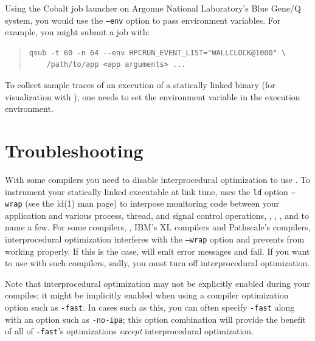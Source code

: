 \documentclass[11pt,letterpaper]{report}
\begin{document}
Using the Cobalt job launcher on Argonne National Laboratory's Blue Gene/Q system, you would use the \texttt{--env} option to pass environment variables.
For example, you might submit a job with:
\begin{quote}
\begin{verbatim}
qsub -t 60 -n 64 --env HPCRUN_EVENT_LIST="WALLCLOCK@1000" \
    /path/to/app <app arguments> ...
\end{verbatim}
\end{quote}

To collect sample traces of  an execution of a statically linked binary (for visualization with \hpctraceviewer{}), one needs to set the environment variable  in the execution environment.



\section{Troubleshooting}

With some compilers you need to disable interprocedural optimization to use \hpclink{}.
To instrument your statically linked executable at link time, \hpclink{} uses the \texttt{ld} option \texttt{--wrap} (see the ld(1) man page) to interpose monitoring code between your application and various process, thread, and signal control operations, \eg{}, , , and  to name a few.
For some compilers, \eg{}, IBM's XL compilers and Pathscale's compilers, interprocedural optimization interferes with the \texttt{--wrap} option and prevents \hpclink{} from working properly.
If this is the case, \hpclink{} will emit error messages and fail.
If you want to use \hpclink{} with such compilers, sadly, you must turn off interprocedural optimization.

Note that interprocedural optimization may not be explicitly enabled during your compiles; it might be implicitly enabled when using a compiler optimization option such as \texttt{-fast}.
In cases such as this, you can often specify \texttt{-fast} along with an option such as \texttt{-no-ipa}; this option combination will provide the benefit of all of \texttt{-fast}'s optimizations {\em except} interprocedural optimization.


\end{document}

